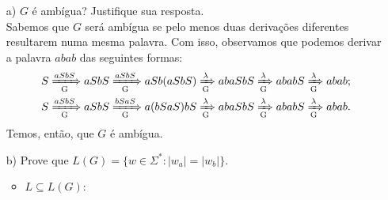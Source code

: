 \documentclass{homework}
\begin{document}
\pagebreak		
		
	\begin{enumerate}
		\item[a)] $G$ é ambígua? Justifique sua resposta.\\
		Sabemos que $G$ será ambígua se pelo menos duas derivações diferentes resultarem numa mesma palavra. Com isso, observamos que podemos derivar a palavra $abab$ das seguintes formas:
		\begin{align*}
			S & \xRightarrow[\text{G}]{aSbS} aSbS \xRightarrow[\text{G}]{aSbS} aSb(aSbS) \xRightarrow[\text{G}]{\lambda} abaSbS \xRightarrow[\text{G}]{\lambda} ababS \xRightarrow[\text{G}]{\lambda} abab;\\
			S & \xRightarrow[\text{G}]{aSbS} aSbS \xRightarrow[\text{G}]{bSaS} a(bSaS)bS \xRightarrow[\text{G}]{\lambda} abaSbS \xRightarrow[\text{G}]{\lambda} ababS \xRightarrow[\text{G}]{\lambda} abab.
		\end{align*}
		Temos, então, que $G$ é ambígua.
		\item[b)] Prove que $L(G) = \{w \in \Sigma^*: |w_a| = |w_b|\}$.
			\begin{itemize}
				\item $L \subseteq L(G)$:\\
				
			\end{itemize}
	\end{enumerate}
	
\end{document}
